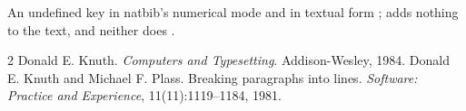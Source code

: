 \documentclass{article}
\begin{document}
An undefined key in natbib's numerical mode \citep{knuth84,missing,plass81}
and in textual form \citet{missing}; \nocite{plass81} adds nothing to the
text, and neither does \nocite{absent}.

\begin{thebibliography}{2}
 Donald E. Knuth. \emph{Computers and Typesetting}. Addison-Wesley, 1984.
 Donald E. Knuth and Michael F. Plass.
  Breaking paragraphs into lines. \emph{Software: Practice and Experience},
  11(11):1119--1184, 1981.
\end{thebibliography}
\end{document}
